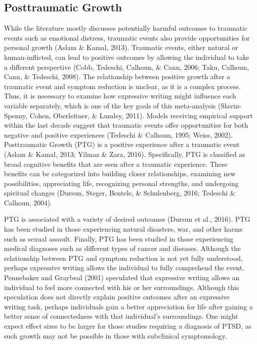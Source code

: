 \documentclass[man, mask]{apa6}
\theoremstyle{definition}
\theoremstyle{definition}
\theoremstyle{definition}
\theoremstyle{remark}
\begin{document}
\subsection{Posttraumatic Growth}\label{posttraumatic-growth}

While the literature mostly discusses potentially harmful outcomes to
traumatic events such as emotional distress, traumatic events also
provide opportunities for personal growth (Aslam \& Kamal, 2013).
Traumatic events, either natural or human-inflicted, can lead to
positive outcomes by allowing the individual to take a different
perspective (Cobb, Tedeschi, Calhoun, \& Cann, 2006; Taku, Calhoun,
Cann, \& Tedeschi, 2008). The relationship between positive growth after
a traumatic event and symptom reduction is unclear, as it is a complex
process. Thus, it is necessary to examine how expressive writing might
influence each variable separately, which is one of the key goals of
this meta-analysis (Slavin-Spenny, Cohen, Oberleitner, \& Lumley, 2011).
Models receiving empirical support within the last decade suggest that
traumatic events offer opportunities for both negative and positive
experiences (Tedeschi \& Calhoun, 1995; Weiss, 2002). Posttraumatic
Growth (PTG) is a positive experience after a traumatic event (Aslam \&
Kamal, 2013; Yilmaz \& Zara, 2016). Specifically, PTG is classified as
broad cognitive benefits that are seen after a traumatic experience.
These benefits can be categorized into building closer relationships,
examining new possibilities, appreciating life, recognizing personal
strengths, and undergoing spiritual changes (Dursun, Steger, Bentele, \&
Schulenberg, 2016; Tedeschi \& Calhoun, 2004).

PTG is associated with a variety of desired outcomes (Dursun et al.,
2016). PTG has been studied in those experiencing natural disasters,
war, and other harms such as sexual assault. Finally, PTG has been
studied in those experiencing medical diagnoses such as different types
of cancer and diseases. Although the relationship between PTG and
symptom reduction is not yet fully understood, perhaps expressive
writing allows the individual to fully comprehend the event. Pennebaker
and Graybeal (2001) speculated that expressive writing allows an
individual to feel more connected with his or her surroundings. Although
this speculation does not directly explain positive outcomes after an
expressive writing task, perhaps individuals gain a better appreciation
for life after gaining a better sense of connectedness with that
individual's surroundings. One might expect effect sizes to be larger
for those studies requiring a diagnosis of PTSD, as such growth may not
be possible in those with subclinical symptomology.
\end{document}
